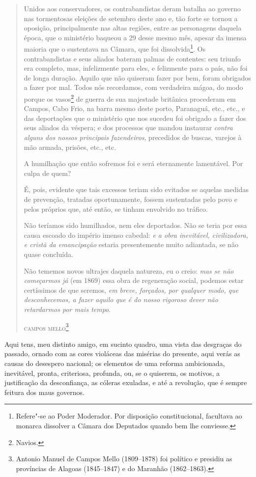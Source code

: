 \begin{quote}
Unidos aos conservadores, os contrabandistas deram batalha ao governo
nas tormentosas eleições de setembro deste ano e, tão forte se tornou a
oposição, principalmente nas altas regiões, entre as personagens daquela
época, que o ministério baqueou a 29 desse mesmo mês, apesar da imensa
maioria que o sustentava na Câmara, que foi dissolvida\footnote{
  Refere"-se ao Poder Moderador. Por disposição constitucional,
  facultava ao monarca dissolver a Câmara dos Deputados quando bem lhe
  conviesse.}. Os contrabandistas e seus aliados bateram palmas de
contentes: seu triunfo era completo, mas, infelizmente para eles, e
felizmente para o país, não foi de longa duração. Aquilo que não
quiseram fazer por bem, foram obrigados a fazer por mal. Todos nós
recordamos, com verdadeira mágoa, do modo porque os vasos\footnote{
  Navios.} de guerra de sua majestade britânica procederam em Campos,
Cabo Frio, na barra mesmo deste porto, Paranaguá, etc., etc., e das
deportações que o ministério que nos sucedeu foi obrigado a fazer dos
seus aliados da véspera; e dos processos que mandou instaurar
\emph{contra alguns dos nossos principais fazendeiros}, precedidos de
buscas, varejos à mão armada, prisões, etc., etc.

A humilhação que então sofremos foi e será eternamente lamentável. Por
culpa de quem?

É, pois, evidente que tais excessos teriam sido evitados se aquelas
medidas de prevenção, tratadas oportunamente, fossem sustentadas pelo
povo e pelos próprios que, até então, se tinham envolvido no tráfico.

Não teríamos sido humilhados, nem eles deportados. Não se teria por essa
causa escoado do império imenso cabedal: \emph{e a obra inevitável,
civilizadora, e cristã da emancipação} estaria presentemente muito
adiantada, se não quase concluída.

Não tememos novos ultrajes daquela natureza, eu o creio: \emph{mas se
não começarmos já} (em 1869) essa obra de regeneração social, podemos
estar certíssimos de que seremos, \emph{em breve, forçados, por qualquer
modo, que desconhecemos, a fazer aquilo que é do nosso rigoroso dever
não retardarmos por mais tempo}.

\hfill\textsc{campos mello}\footnote{Antonio Manuel de Campos Mello (1809--1878) foi
  político e presidiu as províncias de Alagoas (1845--1847) e do Maranhão
  (1862--1863).}
\end{quote}  

Aqui tens, meu distinto amigo, em sucinto quadro, uma vista das
desgraças do passado, ornado com as cores violáceas das misérias do
presente, aqui verás as causas do desespero nacional; os elementos de
uma reforma ambicionada, inevitável, pronta, criteriosa, profunda, ou,
se o quiserem, os motivos, a justificação da desconfiança, as cóleras
exuladas, e até a revolução, que é sempre feitura dos maus governos.

